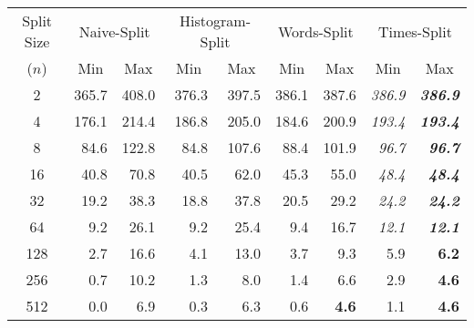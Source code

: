 \begin{tabular} {| c || r | r || r | r || r | r || r | r |}
\hline
Split Size & \multicolumn{2}{|c||}{\sc Naive-Split} & \multicolumn{2}{|c||}{\sc Histogram-Split} & \multicolumn{2}{|c||}{\sc Words-Split} & \multicolumn{2}{|c|}{\sc Times-Split} \\ \cline{2-9}
($n$) & \multicolumn{1}{|c|}{Min} & \multicolumn{1}{|c||}{Max} & \multicolumn{1}{|c|}{Min} & \multicolumn{1}{|c||}{Max} & \multicolumn{1}{|c|}{Min} & \multicolumn{1}{|c||}{Max} & \multicolumn{1}{|c|}{Min} & \multicolumn{1}{|c|}{Max} \\ \hline
2 & {365.7} & {408.0 } & {376.3} & {397.5 } & {386.1} & {387.6 } & \textit{386.9} & \textbf{\textit{386.9 }} \\ \hline
4 & {176.1} & {214.4 } & {186.8} & {205.0 } & {184.6} & {200.9 } & \textit{193.4} & \textbf{\textit{193.4 }} \\ \hline
8 & {84.6} & {122.8 } & {84.8} & {107.6 } & {88.4} & {101.9 } & \textit{96.7} & \textbf{\textit{96.7 }} \\ \hline
16 & {40.8} & {70.8 } & {40.5} & {62.0 } & {45.3} & {55.0 } & \textit{48.4} & \textbf{\textit{48.4 }} \\ \hline
32 & {19.2} & {38.3 } & {18.8} & {37.8 } & {20.5} & {29.2 } & \textit{24.2} & \textbf{\textit{24.2 }} \\ \hline
64 & {9.2} & {26.1 } & {9.2} & {25.4 } & {9.4} & {16.7 } & \textit{12.1} & \textbf{\textit{12.1 }} \\ \hline
128 & {2.7} & {16.6 } & {4.1} & {13.0 } & {3.7} & {9.3 } & {5.9} & \textbf{6.2 } \\ \hline
256 & {0.7} & {10.2 } & {1.3} & {8.0 } & {1.4} & {6.6 } & {2.9} & \textbf{4.6 } \\ \hline
512 & {0.0} & {6.9 } & {0.3} & {6.3 } & {0.6} & \textbf{4.6 } & {1.1} & \textbf{4.6 } \\ \hline
\end{tabular}
